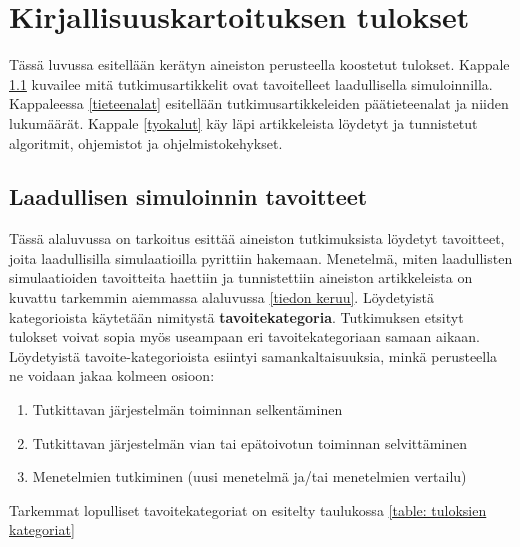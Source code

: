 \documentclass[utf8]{gradu3}
\begin{document}
\chapter{Kirjallisuuskartoituksen tulokset}
Tässä luvussa esitellään kerätyn aineiston perusteella koostetut tulokset.
Kappale \ref{simulaatiotulokset} kuvailee 
mitä tutkimusartikkelit ovat tavoitelleet laadullisella simuloinnilla.
Kappaleessa \ref{tieteenalat} esitellään tutkimusartikkeleiden 
päätieteenalat ja niiden lukumäärät. 
Kappale \ref{tyokalut} käy läpi artikkeleista löydetyt 
ja tunnistetut algoritmit, ohjemistot ja ohjelmistokehykset. 

\section{Laadullisen simuloinnin tavoitteet} \label{simulaatiotulokset}
Tässä alaluvussa on tarkoitus esittää aineiston tutkimuksista 
löydetyt tavoitteet, joita laadullisilla simulaatioilla pyrittiin hakemaan.
Menetelmä, miten laadullisten simulaatioiden tavoitteita haettiin 
ja tunnistettiin aineiston artikkeleista on kuvattu tarkemmin 
aiemmassa alaluvussa \ref{tiedon keruu}.
Löydetyistä kategorioista käytetään nimitystä \textbf{tavoitekategoria}.
Tutkimuksen etsityt tulokset voivat sopia myös useampaan eri tavoitekategoriaan
samaan aikaan. Löydetyistä tavoite-kategorioista esiintyi samankaltaisuuksia, 
minkä perusteella ne voidaan jakaa kolmeen osioon:
\begin{enumerate}
    \item Tutkittavan järjestelmän toiminnan selkentäminen
    \item Tutkittavan järjestelmän vian tai epätoivotun toiminnan selvittäminen
    \item Menetelmien tutkiminen (uusi menetelmä ja/tai menetelmien vertailu)
\end{enumerate}

Tarkemmat lopulliset tavoitekategoriat on esitelty taulukossa \ref{table: tuloksien kategoriat}
\end{document}
